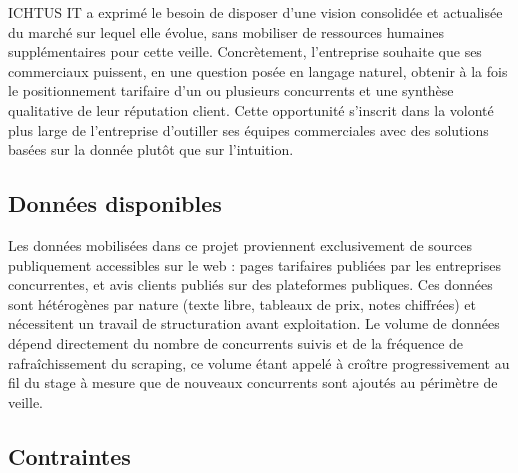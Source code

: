 ICHTUS IT a exprimé le besoin de disposer d'une vision consolidée et actualisée du marché sur lequel elle
évolue, sans mobiliser de ressources humaines supplémentaires pour cette veille. Concrètement, l'entreprise
souhaite que ses commerciaux puissent, en une question posée en langage naturel, obtenir à la fois le
positionnement tarifaire d'un ou plusieurs concurrents et une synthèse qualitative de leur réputation
client. Cette opportunité s'inscrit dans la volonté plus large de l'entreprise d'outiller ses équipes
commerciales avec des solutions basées sur la donnée plutôt que sur l'intuition.

\subsection{Données disponibles}

Les données mobilisées dans ce projet proviennent exclusivement de sources publiquement accessibles sur
le web : pages tarifaires publiées par les entreprises concurrentes, et avis clients publiés sur des plateformes
publiques. Ces données sont hétérogènes par nature (texte libre, tableaux de prix, notes chiffrées) et
nécessitent un travail de structuration avant exploitation. Le volume de données dépend directement du
nombre de concurrents suivis et de la fréquence de rafraîchissement du scraping, ce volume étant appelé à
croître progressivement au fil du stage à mesure que de nouveaux concurrents sont ajoutés au périmètre de
veille.

\subsection{Contraintes}

